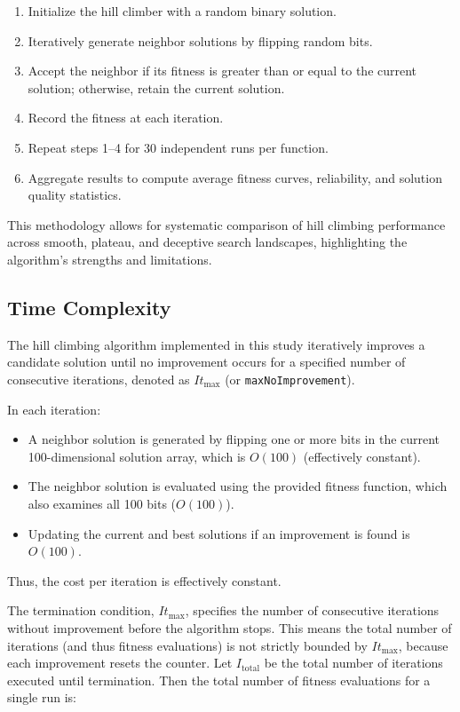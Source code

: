 \documentclass[11pt]{article}
\begin{document}
\begin{enumerate}
    \item Initialize the hill climber with a random binary solution.
    \item Iteratively generate neighbor solutions by flipping random bits.
    \item Accept the neighbor if its fitness is greater than or equal to the current solution; otherwise, retain the current solution.
    \item Record the fitness at each iteration.
    \item Repeat steps 1--4 for 30 independent runs per function.
    \item Aggregate results to compute average fitness curves, reliability, and solution quality statistics.
\end{enumerate}

This methodology allows for systematic comparison of hill climbing performance across smooth, plateau, and deceptive search landscapes, highlighting the algorithm’s strengths and limitations.

\subsection{Time Complexity}
The hill climbing algorithm implemented in this study iteratively improves a candidate solution until no improvement occurs for a specified number of consecutive iterations, denoted as $It_\text{max}$ (or \texttt{maxNoImprovement}).  

In each iteration:  
\begin{itemize}
    \item A neighbor solution is generated by flipping one or more bits in the current 100-dimensional solution array, which is $O(100)$ (effectively constant).  
    \item The neighbor solution is evaluated using the provided fitness function, which also examines all 100 bits ($O(100)$).  
    \item Updating the current and best solutions if an improvement is found is $O(100)$.  
\end{itemize}

Thus, the cost per iteration is effectively constant.  

The termination condition, $It_\text{max}$, specifies the number of consecutive iterations without improvement before the algorithm stops. This means the total number of iterations (and thus fitness evaluations) is not strictly bounded by $It_\text{max}$, because each improvement resets the counter. Let $I_\text{total}$ be the total number of iterations executed until termination. Then the total number of fitness evaluations for a single run is:
\end{document}
